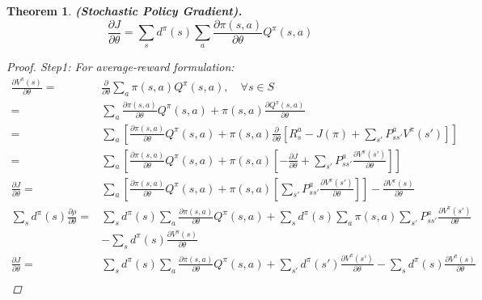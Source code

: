 \documentclass[a4paper]{article}
\newtheorem{theorem}{Theorem}
\begin{document}
\begin{theorem}
    \textbf{(Stochastic Policy Gradient).}
    \begin{equation}
        \frac{\partial J}{\partial \theta} =  
        \sum^{}_{s} d^\pi(s) \sum^{}_{a} \frac{\partial \pi(s, a)}{\partial \theta} Q^\pi(s, a)
    \end{equation}
    \begin{proof}
    Step1: For average-reward formulation:
        \begin{align*}
            \frac{\partial{V^\pi(s)}}{\partial{\theta}} 
            =& \frac{\partial{}}{\partial{\theta}} \sum^{}_{a} \pi(s,a) Q^\pi(s,a), \quad \forall s \in S \\
            =& \sum^{}_{a} \frac{\partial{\pi(s,a)}}{\partial{\theta}} Q^\pi(s,a) + \pi(s,a) \frac{\partial{Q^\pi(s,a)}}{\partial{\theta}} \\
            =& \sum^{}_{a} \left[ \frac{\partial{\pi(s, a)}}{\partial{\theta}} Q^\pi(s,a)  + \pi(s,a) \frac{\partial{}}{\partial{\theta}} \left[ R^a_s - J(\pi) + \sum^{}_{s'} P^a_{ss'} V^\pi(s') \right] \right] \\
            =& \sum^{}_{a} \left[ \frac{\partial{\pi(s, a)}}{\partial{\theta}} Q^\pi(s,a)  + \pi(s,a) \left[ -\frac{\partial{J}}{\partial{\theta}} + \sum^{}_{s'} P^a_{ss'} \frac{\partial{V^\pi(s')}}{\partial{\theta}}  \right] \right]\\
            \frac{\partial{J}}{\partial{\theta}} 
            =& \sum^{}_{a} \left[ \frac{\partial{\pi(s, a)}}{\partial{\theta}} Q^\pi(s,a)  + \pi(s,a) \left[\sum^{}_{s'} P^a_{ss'} \frac{\partial{V^\pi(s')}}{\partial{\theta}}  \right] \right] - \frac{\partial{V^\pi(s)}}{\partial{\theta}} \\
            \sum^{}_{s} d^\pi(s) \frac{\partial{\rho}}{\partial{\theta}} 
            =& \sum^{}_{s} d^\pi(s) \sum^{}_{a} \frac{\partial{\pi(s,a)}}{\partial{\theta}} Q^\pi(s,a)
            + \sum^{}_{s} d^\pi(s) \sum^{}_{a} \pi(s,a) \sum^{}_{s'} P^a_{ss'} \frac{\partial{V^\pi(s')}}{\partial{\theta}}  \\
             &- \sum^{}_{s} d^\pi(s) \frac{\partial{V^\pi(s)}}{\partial{\theta}} \\
             \frac{\partial{J}}{\partial{\theta}} 
            =& \sum^{}_{s} d^\pi(s) \sum^{}_{a} \frac{\partial{\pi(s,a)}}{\partial{\theta}} Q^\pi(s,a)
            + \sum^{}_{s'} d^\pi(s') \frac{\partial{V^\pi(s')}}{\partial{\theta}}
            - \sum^{}_{s} d^\pi(s) \frac{\partial{V^\pi(s)}}{\partial{\theta}}\\

\end{align*}
\end{proof}
\end{theorem}
\end{document}
